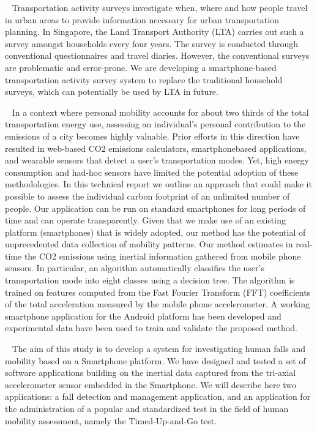 ~\cite{6181051}
Transportation activity surveys investigate when, where and how people travel in urban areas to provide information necessary for urban transportation planning. In Singapore, the Land Transport Authority (LTA) carries out such a survey amongst households every four years. The survey is conducted through conventional questionnaires and travel diaries. However, the conventional surveys are problematic and error-prone. We are developing a smartphone-based transportation activity survey system to replace the traditional household surveys, which can potentially be used by LTA in future.

~\cite{manzoni2010transportation}
In a context where personal mobility accounts for about two thirds of the total transportation energy use, assessing an individual’s personal contribution to the emissions of a city becomes highly valuable. Prior eﬀorts in this direction have resulted in web-based CO2 emissions calculators, smartphonebased applications, and wearable sensors that detect a user’s transportation modes. Yet, high energy consumption and had-hoc sensors have limited the potential adoption of these methodologies. In this technical report we outline an approach that could make it possible to assess the individual carbon footprint of an unlimited number of people. Our application can be run on standard smartphones for long periods of time and can operate transparently. Given that we make use of an existing platform (smartphones) that is widely adopted, our method has the potential of unprecedented data collection of mobility patterns. Our method estimates in real-time the CO2 emissions using inertial information gathered from mobile phone sensors. In particular, an algorithm automatically classiﬁes the user’s transportation mode into eight classes using a decision tree. The algorithm is trained on features computed from the Fast Fourier Transform (FFT) coeﬃcients of the total acceleration measured by the mobile phone accelerometer. A working smartphone application for the Android platform has been developed and experimental data have been used to train and validate the proposed method.


~\cite{6038808}
The aim of this study is to develop a system for investigating human falls and mobility based on a Smartphone platform. We have designed and tested a set of software applications building on the inertial data captured from the tri-axial accelerometer sensor embedded in the Smartphone. We will describe here two applications: a fall detection and management application, and an application for the administration of a popular and standardized test in the field of human mobility assessment, namely the Timed-Up-and-Go test.

